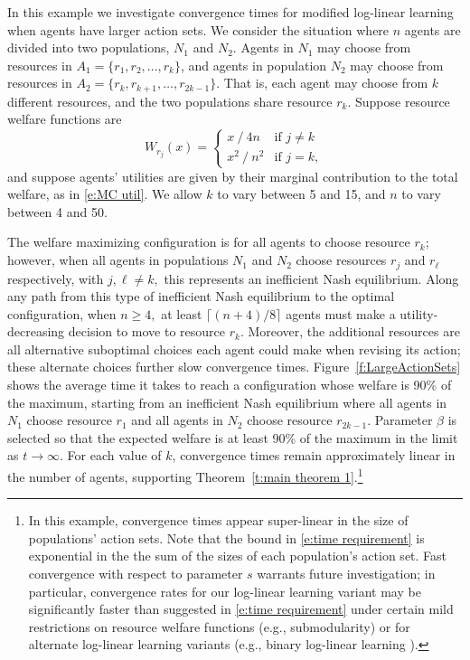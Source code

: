 \begin{example}\label{s:large action sets}
In this example we investigate convergence times for modified log-linear learning when agents have larger action sets.   We consider the situation where $n$ agents are divided into two populations, $N_1$ and $N_2$. Agents in $N_1$ may choose from resources in $A_1 =\{r_1,r_2,\ldots,r_k\}$, and agents in population $N_2$ may choose from resources in $A_2 = \{r_k,r_{k+1}, \ldots, r_{2k-1}\}.$ That is, each agent may choose from $k$ different resources, and the two populations share resource $r_k$. Suppose resource welfare functions are
\begin{equation}\label{e:large action welfares}W_{r_j}(x) = 
\begin{cases}
x\mathop{/}4n  & \text{if } j\neq k\\
x^2\mathop{/}n^2 &\text{if } j=k,
\end{cases}
\end{equation}
and suppose agents' utilities are given by their marginal contribution to the total welfare, as in \eqref{e:MC util}. We allow $k$ to vary between 5 and 15, and $n$ to vary between 4 and 50. 

The welfare maximizing configuration is for all agents to choose resource $r_k$; however, when all agents in populations $N_1$ and $N_2$ choose resources $r_j$ and $r_{\ell}$ respectively, with $j,\ell\neq k,$ this represents an inefficient Nash equilibrium. Along any path from this type of inefficient Nash equilibrium to the optimal configuration, when $n\geq 4,$ at least $\lceil (n+4)/8\rceil$ agents must make a utility-decreasing decision to move to resource $r_k$. Moreover, the additional resources are all alternative suboptimal choices each agent could make when revising its action; these alternate choices further slow convergence times. Figure~\ref{f:LargeActionSets} shows the average time it takes to reach a configuration whose welfare is 90\% of the maximum, starting from an inefficient Nash equilibrium where all agents in $N_1$ choose resource $r_1$ and all agents in $N_2$ choose resource $r_{2k-1}.$ Parameter $\beta$ is selected so that the expected welfare is at least 90\% of the maximum in the limit as $t\to \infty.$ For each value of $k$, convergence times remain approximately linear in the number of agents, supporting Theorem~\ref{t:main theorem 1}.\footnote{In this example, convergence times appear super-linear in the size of populations' action sets. Note that the bound in \eqref{e:time requirement} is exponential in the the sum of the sizes of each population's action set.  Fast convergence with respect to parameter $s$ warrants future investigation; in particular, convergence rates for our log-linear learning variant may be significantly faster than suggested in \eqref{e:time requirement} under certain mild restrictions on resource welfare functions (e.g., submodularity) or for alternate log-linear learning variants (e.g., binary log-linear learning \cite{Arslan2007, Marden2007a}).}


\end{example}
